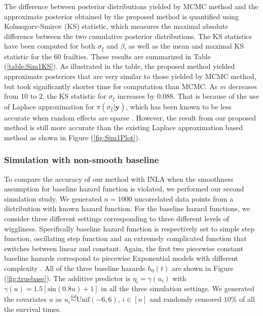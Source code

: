 \documentclass[ba]{imsart}
\begin{document}
The difference between posterior distributions yielded by MCMC method and the approximate posterior obtained by the proposed method is quantified using Kolmogorv-Smirov (KS) statistic, which measures the maximal absolute difference between the two cumulative posterior distributions. The KS statistics have been computed for both $\sigma_\xi$ and $\beta$, as well as the mean and maximal KS statistic for the $60$ frailties. These results are summarized in Table (\ref{table:Sim1KS}).  As illustrated in the table, the proposed method yielded approximate posteriors that are very similar to those yielded by MCMC method, but took significantly shorter time for computation than MCMC. As $m$ decreases from $10$ to $2$, the KS statistic for $\sigma_\xi$ increases by 0.088. That is because of the use of Laplace approximation for $\pi(\sigma_\xi|\boldsymbol{y})$, which has been known to be less accurate when random effects are sparse \citep{Ogden2013ASR}. However, the result from our proposed method is still more accurate than the existing Laplace approximation based method as shown in Figure (\ref{fig:Sim1Plot}).



\subsubsection{Simulation with non-smooth baseline}\label{subsubsec:sim2}

To compare the accuracy of our method with INLA when the smoothness assumption for baseline hazard function is violated, we performed our second simulation study. We generated $n = 1000$ uncorrelated data points from a distribution with known hazard function. For the baseline hazard functions, we consider three different settings corresponding to three different levels of wiggliness. Specifically baseline hazard function is respectively set to simple step function, oscillating step function and an extremely complicated function that switches between linear and constant. Again, the first two piecewise constant baseline hazards correspond to piecewise Exponential models with different complexity \citep{piecewiseExp}. All of the three baseline hazards $h_{0}(t)$ are shown in Figure (\ref{fig:truebase}). The additive predictor is $\eta_{i} = \gamma\left(u_{i}\right)$ with $\gamma(u) = 1.5 [ \text{sin}(0.8u) + 1 ]$ in all the three simulation settings. We generated the covariates $u$ as  $u_{i}\overset{iid}{\sim}\text{Unif}(-6,6)$, $i \in [n]$ and randomly censored $10\%$ of all the survival times.
\end{document}
